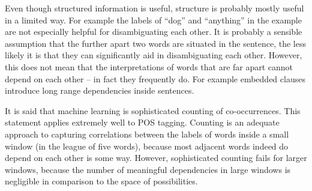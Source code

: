 Even though structured information is useful, structure is probably
mostly useful in a limited way. For example the labels of ``dog'' and
``anything'' in the example are not especially helpful for
disambiguating each other. It is probably a sensible assumption that
the further apart two words are situated in the sentence, the less
likely it is that they can significantly aid in disambiguating each
other. However, this does not mean that the interpretations of words
that are far apart cannot depend on each other -- in fact they
frequently do. For example embedded clauses introduce long range
dependencies inside sentences.

It is said that machine learning is sophisticated counting of
co-occurrences. This statement applies extremely well to POS
tagging. Counting is an adequate approach to capturing correlations
between the labels of words inside a small window (in the league of
five words), because most adjacent words indeed do depend on each
other is some way. However, sophisticated counting fails for larger
windows, because the number of meaningful dependencies in large
windows is negligible in comparison to the space of possibilities.

